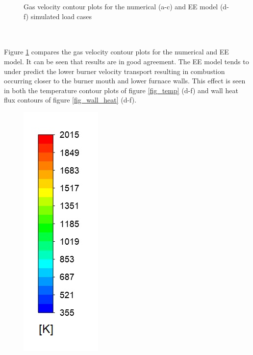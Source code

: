 \documentclass{webofc}
\begin{document}
\begin{figure}[h!]
\setlength{\belowcaptionskip}{0pt}
\caption{Gas velocity contour plots for the numerical (a-c) and EE model (d-f) simulated load cases}
\label{fig_velocity}
\end{figure}\\
\\
Figure \ref{fig_velocity} compares the gas velocity contour plots for the numerical and EE model. It can be seen that results are in good agreement. The EE model tends to under predict the lower burner velocity transport resulting in combustion occurring closer to the burner mouth and lower furnace walls. This effect is seen in both the temperature contour plots of figure \ref{fig_temp} (d-f) and wall heat flux contours of figure \ref{fig_wall_heat} (d-f).
\begin{figure}[h!]
\centering
\includegraphics[scale = 0.3]{temp} 

\end{figure}
\end{document}
